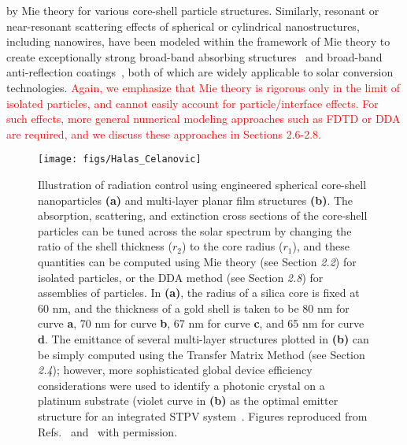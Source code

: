 \documentclass[10pt,letterpaper]{article}
\begin{document}
by Mie theory for various core-shell particle structures.  
Similarly, resonant or near-resonant scattering effects of spherical or cylindrical 
nanostructures, including nanowires, have been modeled within the framework of Mie theory to create exceptionally strong broad-band absorbing structures~\cite{FKA_OptExp_2014}
and broad-band anti-reflection coatings~\cite{SVP_NatComm_2012}, both of which are 
widely applicable to solar conversion technologies.  
\textcolor{red}{Again, we emphasize that Mie theory is rigorous only in the limit of isolated particles, and cannot easily account for particle/interface effects. 
For such effects, more general numerical modeling approaches such as FDTD or DDA are required, and we discuss these approaches in Sections 2.6-2.8.}
\begin{figure}[h]
\begin{center}
        \texttt{[image: figs/Halas\_Celanovic]}
        \caption{\label{Halas}  Illustration of radiation control using engineered spherical core-shell
nanoparticles {\bf (a)} and multi-layer planar film structures {\bf (b)}.
The absorption, scattering, and extinction cross sections of the core-shell particles can be tuned
across the solar spectrum by changing the ratio of the shell thickness ($r_2$) to the core radius ($r_1$), 
and these
quantities can be computed using Mie theory (see Section {\it 2.2}) for isolated particles, or the 
DDA method (see Section {\it 2.8}) for assemblies of particles.
In {\bf (a)}, the radius of a silica core is fixed at 60 nm, and the thickness of a gold shell is
taken to be 80 nm for curve {\bf a},
70 nm for curve {\bf b}, 67 nm for curve {\bf c}, and 65 nm for curve {\bf d}.
The emittance of several multi-layer structures plotted in {\bf (b)} can be simply computed
using the Transfer Matrix Method (see Section {\it 2.4}); however, 
more sophisticated global device
efficiency considerations were used to identify a photonic crystal on a platinum substrate 
(violet curve in {\bf (b)} as the optimal emitter structure for
an integrated STPV system~\cite{g4}.
Figures reproduced from Refs.~\cite{CH_APL_2006} and~\cite{g4} with permission.}
\end{center}
\end{figure}
\end{document}
